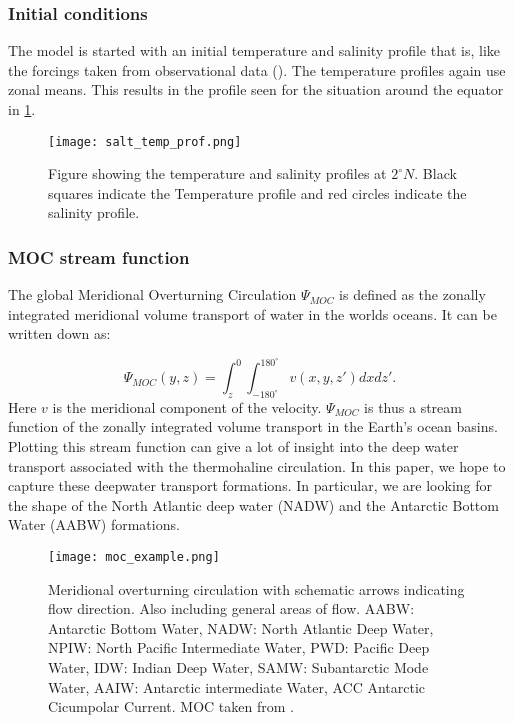 \begin{multicols}{2}
 \subsubsection{Initial conditions}
The model is started with an initial temperature and salinity profile that is, like the forcings taken from observational data (\cite{ECMWFForc}). The temperature profiles again use zonal means. This results in the profile seen for the situation around the equator in \cref{fig:salt_temp_prf}.

\begin{figure}[H]
	\texttt{[image: salt\_temp\_prof.png]}
	\caption{Figure showing the temperature and salinity profiles at $2^{\circ} N$. Black squares indicate the Temperature profile and red circles indicate the salinity profile.}
	\label{fig:salt_temp_prf}
\end{figure}
 
 \subsubsection{MOC stream function} \label{sec:MOCSTREAM}
 

The global Meridional Overturning Circulation $\Psi_{MOC}$ is defined as the zonally integrated meridional volume transport of water in the worlds oceans. It can be written down as:

$$
\Psi_{MOC}(y,z) = \int_{z}^{0} \int_{-180^{\circ}}^{180^{\circ}} v(x,y,z') dx dz'.
$$
Here $v$ is the meridional component of the velocity.
$ \Psi_{MOC}$ is thus a stream function of the zonally integrated volume transport in the Earth's ocean basins. Plotting this stream function can give a lot of insight into the deep water transport associated with the thermohaline circulation. In this paper, we hope to capture these deepwater transport formations. In particular, we are looking for the shape of the North Atlantic deep water (NADW) and the Antarctic Bottom Water (AABW) formations.

 \begin{figure}[H]
	\texttt{[image: moc\_example.png]}
	\caption{Meridional overturning circulation with schematic arrows indicating flow direction. Also including general areas of flow. AABW: Antarctic Bottom Water, NADW: North Atlantic Deep Water, NPIW: North Pacific Intermediate Water,  PWD: Pacific Deep Water, IDW: Indian Deep Water, SAMW: Subantarctic Mode Water, AAIW: Antarctic intermediate Water, ACC Antarctic Cicumpolar Current. MOC taken from \cite{Forget2015Oct}.}
	\label{fig:moc_ex}
\end{figure}


\end{multicols}
